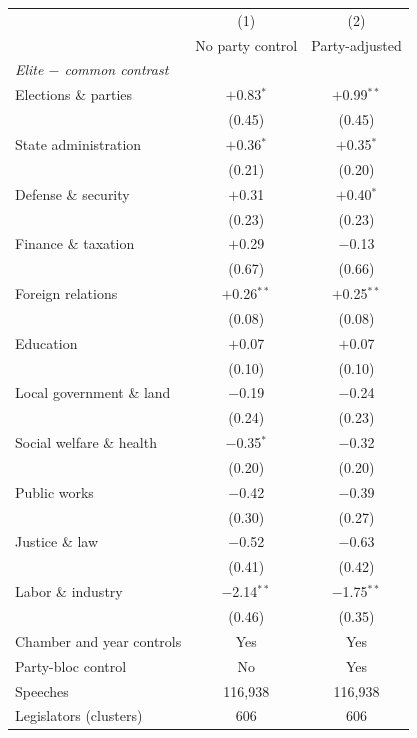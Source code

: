 \begin{tabular}{lcc}
\toprule
 & (1) & (2) \\
 & No party control & Party-adjusted \\
\midrule
\multicolumn{3}{l}{\textit{Elite $-$ common contrast}} \\
Elections \& parties & $+$0.83$^{*}$ & $+$0.99$^{**}$ \\
 & (0.45) & (0.45) \\
State administration & $+$0.36$^{*}$ & $+$0.35$^{*}$ \\
 & (0.21) & (0.20) \\
Defense \& security & $+$0.31 & $+$0.40$^{*}$ \\
 & (0.23) & (0.23) \\
Finance \& taxation & $+$0.29 & $-$0.13 \\
 & (0.67) & (0.66) \\
Foreign relations & $+$0.26$^{**}$ & $+$0.25$^{**}$ \\
 & (0.08) & (0.08) \\
Education & $+$0.07 & $+$0.07 \\
 & (0.10) & (0.10) \\
Local government \& land & $-$0.19 & $-$0.24 \\
 & (0.24) & (0.23) \\
Social welfare \& health & $-$0.35$^{*}$ & $-$0.32 \\
 & (0.20) & (0.20) \\
Public works & $-$0.42 & $-$0.39 \\
 & (0.30) & (0.27) \\
Justice \& law & $-$0.52 & $-$0.63 \\
 & (0.41) & (0.42) \\
Labor \& industry & $-$2.14$^{**}$ & $-$1.75$^{**}$ \\
 & (0.46) & (0.35) \\
\midrule
Chamber and year controls & Yes & Yes \\
Party-bloc control & No & Yes \\
Speeches & 116{,}938 & 116{,}938 \\
Legislators (clusters) & 606 & 606 \\
\bottomrule
\end{tabular}
